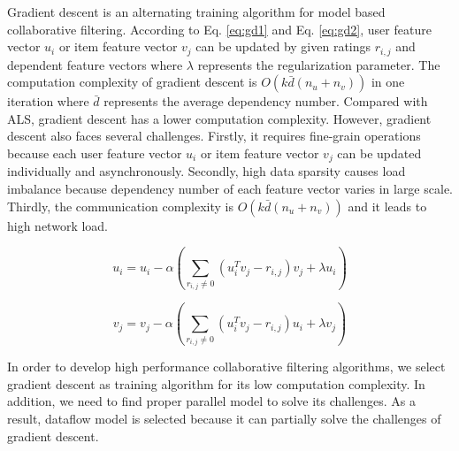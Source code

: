 \documentclass{llncs}
\begin{document}
Gradient descent is an alternating training algorithm for model based collaborative filtering. According to Eq. \ref{eq:gd1} and Eq. \ref{eq:gd2},
user feature vector $u_i$ or item feature vector $v_j$ can be updated by given ratings $r_{i,j}$ and dependent feature vectors where $\lambda$ represents the regularization parameter. The computation complexity of gradient descent is $O(k\bar{d}(n_u + n_v))$ in one iteration where $\bar{d}$ represents the average dependency number. Compared with ALS, gradient descent has a lower computation complexity. However, gradient descent also faces several challenges. Firstly, it requires fine-grain operations because each user feature vector $u_i$ or item feature vector $v_j$ can be updated individually and asynchronously. Secondly, high data sparsity causes load imbalance because dependency number of each feature vector varies in large scale. Thirdly, the communication complexity is $O(k\bar{d}(n_u + n_v))$ and it leads to high network load.
\vspace{-5pt}

\begin{equation}
\label{eq:gd1}
  u_i = u_i - \alpha (\sum_{r_{i,j} \neq 0}(u_i^Tv_j - r_{i,j})v_j + \lambda u_i)
\end{equation}
\vspace{-15pt}

\begin{equation}
\label{eq:gd2}
v_j = v_j - \alpha (\sum_{r_{i,j} \neq 0}(u^T_iv_j - r_{i,j})u_i + \lambda v_j)
\end{equation}


In order to develop high performance collaborative filtering algorithms, we select gradient descent as training algorithm for its low computation complexity. In addition, we need to find proper parallel model to solve its challenges. As a result, dataflow model is selected because it can partially solve the challenges of gradient descent.
%
\end{document}
